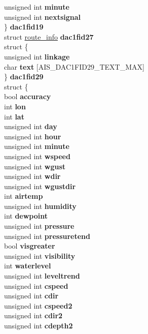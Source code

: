 \begin{DoxyCompactItemize}
{\begin{tabbing}
{\>\>\>\>unsigned int {\bfseries minute}\\
\>\>\>\>unsigned int {\bfseries nextsignal}\\
\>\>\>\} {\bfseries dac1fid19}\\
\>\>\>struct \hyperlink{structroute__info}{route\_info} {\bfseries dac1fid27}\\
\>\>\>struct \{\\
\>\>\>\>unsigned int {\bfseries linkage}\\
\>\>\>\>char {\bfseries text} \mbox{[}AIS\_DAC1FID29\_TEXT\_MAX\mbox{]}\\
\>\>\>\} {\bfseries dac1fid29}\\
\>\>\>struct \{\\
\>\>\>\>bool {\bfseries accuracy}\\
\>\>\>\>int {\bfseries lon}\\
\>\>\>\>int {\bfseries lat}\\
\>\>\>\>unsigned int {\bfseries day}\\
\>\>\>\>unsigned int {\bfseries hour}\\
\>\>\>\>unsigned int {\bfseries minute}\\
\>\>\>\>unsigned int {\bfseries wspeed}\\
\>\>\>\>unsigned int {\bfseries wgust}\\
\>\>\>\>unsigned int {\bfseries wdir}\\
\>\>\>\>unsigned int {\bfseries wgustdir}\\
\>\>\>\>int {\bfseries airtemp}\\
\>\>\>\>unsigned int {\bfseries humidity}\\
\>\>\>\>int {\bfseries dewpoint}\\
\>\>\>\>unsigned int {\bfseries pressure}\\
\>\>\>\>unsigned int {\bfseries pressuretend}\\
\>\>\>\>bool {\bfseries visgreater}\\
\>\>\>\>unsigned int {\bfseries visibility}\\
\>\>\>\>int {\bfseries waterlevel}\\
\>\>\>\>unsigned int {\bfseries leveltrend}\\
\>\>\>\>unsigned int {\bfseries cspeed}\\
\>\>\>\>unsigned int {\bfseries cdir}\\
\>\>\>\>unsigned int {\bfseries cspeed2}\\
\>\>\>\>unsigned int {\bfseries cdir2}\\
\>\>\>\>unsigned int {\bfseries cdepth2}\\
}
\end{tabbing}}
\end{DoxyCompactItemize}

